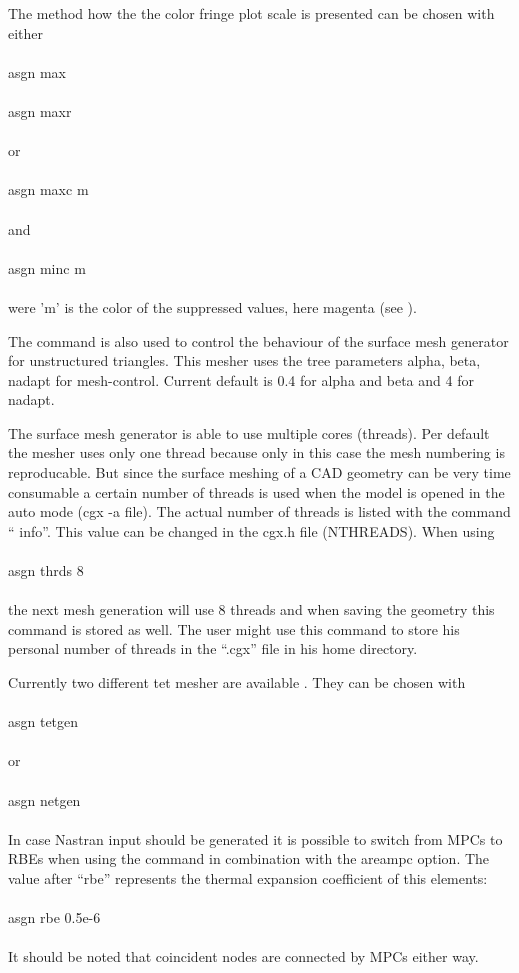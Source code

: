 \documentclass{article}
\begin{document}
The method how the the color fringe plot scale is presented can be chosen with either\\\\asgn max\\\\asgn maxr\\\\or\\\\asgn maxc m\\\\and\\\\asgn minc m\\\\were 'm' is the color of the suppressed values, here magenta (see ). 

The command is also used to control the behaviour of the surface mesh generator for unstructured triangles. This mesher \cite{mesh2d} uses the tree parameters alpha, beta, nadapt for mesh-control. Current default is 0.4 for alpha and beta and 4 for nadapt.

The surface mesh generator is able to use multiple cores (threads). Per default the mesher uses only one thread because only in this case the mesh numbering is reproducable. But since the surface meshing of a CAD geometry can be very time consumable a certain number of threads is used when the model is opened in the auto mode (cgx -a file). The actual number of threads is listed with the command `` info''. This value can be changed in the cgx.h file (NTHREADS). When using\\\\asgn thrds 8\\\\the next mesh generation will use 8 threads and when saving the geometry this command is stored as well. The user might use this command to store his personal number of threads in the ``.cgx'' file in his home directory.

Currently two different tet mesher are available \cite{NETGEN} \cite{TETGEN}. They can be chosen with\\\\asgn tetgen\\\\or\\\\asgn netgen\\\\
In case Nastran input should be generated it is possible to switch from MPCs to RBEs when using the  command in combination with the areampc option. The value after ``rbe'' represents the thermal expansion coefficient of this elements:\\\\asgn rbe 0.5e-6\\\\It should be noted that coincident nodes are connected by MPCs either way.
\end{document}
